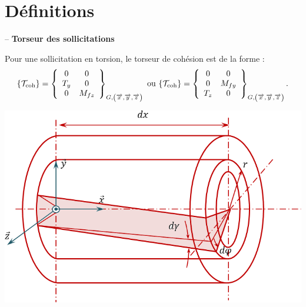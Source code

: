\documentclass[10pt,fleqn]{article} %
\begin{document}

\vspace{2cm}
\pagestyle{fancy}
\thispagestyle{plain}

\section{Définitions}
\begin{defi} -- \textbf{Torseur des sollicitations}  ~\\

\begin{minipage}[c]{.65\linewidth}
Pour une sollicitation en torsion, le torseur de cohésion est de la forme : 
$$
\{\mathcal{T}_{\text{coh}}\} = \torseurcol{0}{T_y}{0}{0}{0}{M_{fz}}{G,\left(\vx{}, \vy{}, \vz{} \right)} 
\text{ ou } 
\{\mathcal{T}_{\text{coh}}\} = \torseurcol{0}{0}{T_z}{0}{M_{fy}}{0}{G,\left(\vx{}, \vy{}, \vz{} \right)} 
.$$
\end{minipage} \hfill
\begin{minipage}[c]{.3\linewidth}
\begin{center}
\includegraphics[width=\linewidth]{images/torsion}
\end{center}
\end{minipage}



\end{defi}
\end{document}
